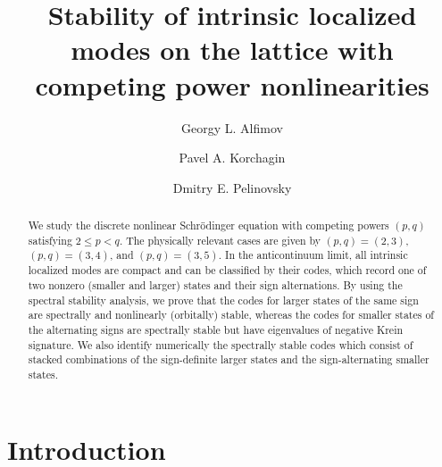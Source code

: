 \documentclass[12pt,reqno]{amsart}
\begin{document}
		\title[Stability of ILMs in the lattice with competing powers]{Stability of intrinsic localized modes on the 
			lattice with competing power nonlinearities}
	
	\author[G. L. Alfimov]{Georgy L. Alfimov}
	\address[G. L. Alfimov]{National Research University of Electronic Technology MIET, Zelenograd, Moscow 124498, Russia}
		
	\author[P. A. Korchagin]{Pavel A. Korchagin}
	\address[P. A. Korchagin]{LLC “LSRM”, Zelenograd, Moscow 124482, Russia}
	
	\author[D. E. Pelinovsky]{Dmitry E. Pelinovsky}
	\address[D. E. Pelinovsky]{Department of Mathematics and Statistics, McMaster University, Hamilton, Ontario, Canada, L8S 4K1}
	
	\begin{abstract}
		We study the discrete nonlinear Schr\"{o}dinger equation with competing powers $(p,q)$ satisfying $2 \leq p < q$. The physically relevant cases are given by $(p,q) = (2,3)$, $(p,q) = (3,4)$, and $(p,q) = (3,5)$. In the anticontinuum limit, all intrinsic localized modes are compact and can be classified by their codes, which record one of two nonzero (smaller and larger) states and their sign alternations. By using the spectral stability analysis, we prove that the codes for larger states of the same sign are spectrally and nonlinearly (orbitally) stable, whereas the codes for smaller states of the alternating signs are spectrally stable but have eigenvalues of negative Krein signature. We also identify numerically the spectrally stable codes which consist of stacked combinations of the sign-definite larger states and the sign-alternating smaller states. 
	\end{abstract}   
	
	\maketitle
	
	
	
	
\section{Introduction}\label{Sec:Problem}
\end{document}
